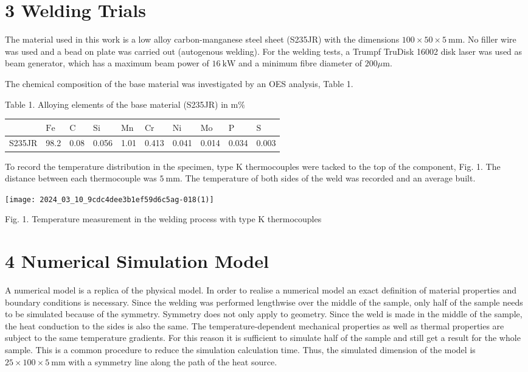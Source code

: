 \documentclass[10pt]{article}
\begin{document}
\section*{3 Welding Trials}
The material used in this work is a low alloy carbon-manganese steel sheet (S235JR) with the dimensions $100 \times 50 \times 5 \mathrm{~mm}$. No filler wire was used and a bead on plate was carried out (autogenous welding). For the welding tests, a Trumpf TruDisk 16002 disk laser was used as beam generator, which has a maximum beam power of $16 \mathrm{~kW}$ and a minimum fibre diameter of $200 \mu \mathrm{m}$.

The chemical composition of the base material was investigated by an OES analysis, Table 1.

Table 1. Alloying elements of the base material (S235JR) in $\mathrm{m} \%$

\begin{center}
\begin{tabular}{l|l|l|l|l|l|l|l|l|l}
\hline
 & $\mathrm{Fe}$ & $\mathrm{C}$ & $\mathrm{Si}$ & $\mathrm{Mn}$ & $\mathrm{Cr}$ & $\mathrm{Ni}$ & $\mathrm{Mo}$ & $\mathrm{P}$ & $\mathrm{S}$ \\
\hline
S235JR & 98.2 & 0.08 & 0.056 & 1.01 & 0.413 & 0.041 & 0.014 & 0.034 & 0.003 \\
\hline
\end{tabular}
\end{center}

To record the temperature distribution in the specimen, type $\mathrm{K}$ thermocouples were tacked to the top of the component, Fig. 1. The distance between each thermocouple was $5 \mathrm{~mm}$. The temperature of both sides of the weld was recorded and an average built.

\begin{center}
\texttt{[image: 2024\_03\_10\_9cdc4dee3b1ef59d6c5ag-018(1)]}
\end{center}

Fig. 1. Temperature measurement in the welding process with type $\mathrm{K}$ thermocouples

\section*{4 Numerical Simulation Model}
A numerical model is a replica of the physical model. In order to realise a numerical model an exact definition of material properties and boundary conditions is necessary. Since the welding was performed lengthwise over the middle of the sample, only half of the sample needs to be simulated because of the symmetry. Symmetry does not only apply to geometry. Since the weld is made in the middle of the sample, the heat conduction to the sides is also the same. The temperature-dependent mechanical properties as well as thermal properties are subject to the same temperature gradients. For this reason it is sufficient to simulate half of the sample and still get a result for the whole sample. This is a common procedure to reduce the simulation calculation time. Thus, the simulated dimension of the model is $25 \times 100 \times 5 \mathrm{~mm}$ with a symmetry line along the path of the heat source.
\end{document}

